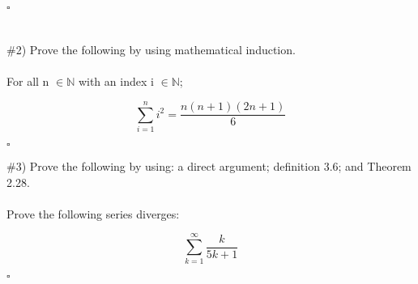 \documentclass[11pt]{article}
\begin{document}
$\square$

\section{}

\#2) Prove the following by using mathematical induction.

\paragraph{}

For all n $\in \mathbb{N}$ with an index i $\in\mathbb{N}$;

\begin{equation}
	\sum_{i=1}^{n}i^2=\frac{n(n+1)(2n+1)}{6}
\end{equation}

$\square$

\#3) Prove the following by using: a direct argument; definition 3.6; and Theorem 2.28.

\paragraph{}

Prove the following series diverges:

\begin{equation}
	\sum_{k=1}^{\infty}\frac{k}{5k+1}
\end{equation}

$\square$

\printbibliography
\end{document}
